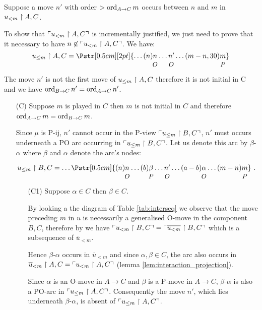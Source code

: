 Suppose a move $n'$ with order $> \mathop{\mathrm{ord}}_{A\rightarrow C}{m}$ occurs between $n$ and $m$ in $u_{<m} \upharpoonright A,C $.

To show that $\ulcorner u_{<m} \upharpoonright A,C \urcorner$ is incrementally justified, we just
need to prove that it necessary to have $n\not\in \ulcorner u_{<m} \upharpoonright A,C \urcorner$. We have:
$$ u_{\leq m} \filter A,C =  
\Pstr[0.5cm][2pt]{ \ldots (n){\stk {n} O}  \ldots
 {\stk {n'} O}  \ldots  (m-n,30){\stk m P}
}
$$

The move $n'$ is not the first
move of $ u_{\leq m} \upharpoonright A,C$  therefore it is not initial in C and we have $\mathop{\mathrm{ord}}_{B\rightarrow C}{n'} = \mathop{\mathrm{ord}}_{A\rightarrow C} {n'}$.

\begin{itemize}
\item[(C)] Suppose $m$ is played in $C$ then $m$ is not initial in $C$ and therefore
$\mathop{\mathrm{ord}}_{A\rightarrow C}{m} = \mathop{\mathrm{ord}}_{B \rightarrow C}{m}$.

Since $\mu$ is P-ij, $n'$ cannot occur in the P-view $\ulcorner u_{\leq m} \upharpoonright B,C \urcorner$, $n'$ must occurs underneath a PO arc occurring in $\ulcorner u_{\leq m} \upharpoonright B,C \urcorner$. Let us denote this arc by $\beta$-$
\alpha$ where $\beta$ and $\alpha$ denote the arc's nodes:

$$ u_{\leq m} \filter B,C = \ldots  
\Pstr[0.5cm]{
 (n){\stk{n} O } \ldots (b){\stk\beta P} \ldots \stk{n'} O  
\ldots (a-b){\stk\alpha O}  \ldots (m-n){\stk m  P }
} \ .
$$

\begin{itemize}
\item[(C1)] Suppose $\alpha \in C$ then $\beta\in C$.

By looking a the diagram of Table \ref{tab:interseq} we observe that the move preceding $m$ in $u$ is necessarily a generalised O-move in the component $B,C$, therefore by \cite[Lemma 3.3.1]{Harmer2005}
we have $\ulcorner u_{<m} \upharpoonright B,C \urcorner = \ulcorner \overline{u_{<m}} \upharpoonright B,C \urcorner$ which is a subsequence of $\overline{u}_{<m}$.

Hence $\beta$-$\alpha$ occurs in $\overline{u}_{<m}$ and since $\alpha,\beta \in C$, the arc also occurs in
$\overline{u}_{<m} \upharpoonright A,C = \ulcorner u_{<m} \upharpoonright A,C \urcorner$ (lemma \ref{lem:interaction_projection}).

Since $\alpha$ is an O-move in $A\rightarrow C$ and $\beta$ is a P-move in $A\rightarrow C$, $\beta$-$\alpha$ is also a PO-arc 
in $\ulcorner u_{\leq m} \upharpoonright A,C \urcorner$. Consequently
the move $n'$, which lies  underneath $\beta$-$\alpha$, is absent of $\ulcorner u_{\leq m} \upharpoonright A,C \urcorner$.



\end{itemize}
\end{itemize}
